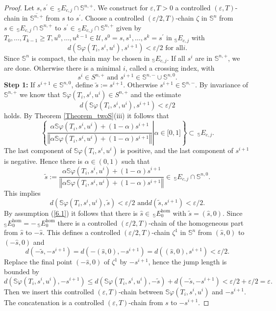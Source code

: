 \documentclass[preprint,12pt]{elsarticle}
\begin{document}
\begin{proof}
Let $s,s^{\prime}\in\,_{\mathbb{S}}E_{c,j}\cap\mathbb{S}^{n,+}$. We construct
for $\varepsilon,T>0$ a controlled $(\varepsilon,T)$-chain in $\overline
{\mathbb{S}^{n,+}}$ from $s$ to $s^{\prime}$. Choose a controlled
$(\varepsilon/2,T)$-chain $\zeta$ in $\mathbb{S}^{n}$ from $s\in
\,_{\mathbb{S}}E_{c,j}\cap\mathbb{S}^{n,+}$ to $s^{\prime}\in\,_{\mathbb{S}%
}E_{c,j}\cap\mathbb{S}^{n,+}$ given by $T_{0},\ldots,T_{k-1}\geq
T,u^{0},\ldots,u^{k-1}\in\mathcal{U},s^{0}=s,s^{1},\ldots,s^{k}=s^{\prime}$ in
$_{\mathbb{S}}E_{c,j}$ with%
\[
d(\mathbb{S}\varphi(T_{i},s^{i},u^{i}),s^{i+1})<\varepsilon/2\text{ for all
}i.
\]
Since $\mathbb{S}^{n}$ is compact, the chain may be chosen in $_{\mathbb{S}%
}E_{c,j}$. If all $s^{i}$ are in $\mathbb{S}^{n,+}$, we are done. Otherwise
there is a minimal $i$, called a crossing index, with%
\begin{equation}
s^{i}\in S^{n,+}\text{ and }s^{i+1}\in\mathbb{S}^{n,-}\cup\mathbb{S}^{n,0}.
\label{crossing}%
\end{equation}
\textbf{Step 1: }If $s^{i+1}\in\mathbb{S}^{n,0}$, define $\widetilde
{s}:=s^{i+1}$. Otherwise $s^{i+1}\in\mathbb{S}^{n,-}$. By invariance of
$\mathbb{S}^{n,+}$ we know that $\mathbb{S}\varphi(T_{i},s^{i},u^{i})\in
S^{n,+}$ and the estimate%
\[
d(\mathbb{S}\varphi(T_{i},s^{i},u^{i}),s^{i+1})<\varepsilon/2
\]
holds. By Theorem \ref{Theorem_twoS}(iii) it follows that%
\[
\left\{  \left.  \frac{\alpha\mathbb{S}\varphi(T_{i},s^{i},u^{i}%
)+(1-\alpha)s^{i+1}}{\left\Vert \alpha\mathbb{S}\varphi(T_{i},s^{i}%
,u^{i})+(1-\alpha)s^{i+1}\right\Vert }\right\vert \alpha\in\lbrack
0,1]\right\}  \subset\,_{\mathbb{S}}E_{c,j}.
\]
The last component of $\mathbb{S}\varphi(T_{i},s^{i},u^{i})$ is positive, and
the last component of $s^{i+1}$ is negative. Hence there is $\alpha\in(0,1)$
such that%
\[
\widetilde{s}:=\frac{\alpha\mathbb{S}\varphi(T_{i},s^{i},u^{i})+(1-\alpha
)s^{i+1}}{\left\Vert \alpha\mathbb{S}\varphi(T_{i},s^{i},u^{i})+(1-\alpha
)s^{i+1}\right\Vert }\in\,_{\mathbb{S}}E_{c,j}\cap\mathbb{S}^{n,0}.
\]
This implies%
\[
d(\mathbb{S}\varphi(T_{i},s^{i},u^{i}),\widetilde{s})<\varepsilon/2\text{ and
}d(\widetilde{s},s^{i+1})<\varepsilon/2.
\]
By assumption (\ref{6.1}) it follows that there is $\widehat{s}\in
\,_{\mathbb{S}}E_{0}^{\hom}$ with $\widetilde{s}=(\widehat{s},0)$. Since
$_{\mathbb{S}}E_{0}^{\hom}=-\,_{\mathbb{S}}E_{0}^{\hom}$ there is a controlled
$(\varepsilon/2,T)$-chain of the homogeneous part from $\widehat{s}$ to
$-\widehat{s}$. This defines a controlled $(\varepsilon/2,T)$-chain $\zeta
^{1}$ in $\mathbb{S}^{n}$ from $(\widehat{s},0)$ to $(-\widehat{s},0)$ and%
\[
d(-\widetilde{s},-s^{i+1})=d(-(\widehat{s},0),-s^{i+1})=d((\widehat
{s},0),s^{i+1})<\varepsilon/2.
\]
Replace the final point $(-\widehat{s},0)$ of $\zeta^{1}$ by $-s^{i+1}$, hence
the jump length is bounded by%
\[
d(\mathbb{S}\varphi(T_{i},s^{i},u^{i}),-s^{i+1})\leq d(\mathbb{S}\varphi
(T_{i},s^{i},u^{i}),-\widetilde{s})+d(-\widetilde{s},-s^{i+1})<\varepsilon
/2+\varepsilon/2=\varepsilon.
\]
Then we insert this controlled $(\varepsilon,T)$-chain between $\mathbb{S}%
\varphi(T_{i},s^{i},u^{i})$ and $-s^{i+1}$. The concatenation is a controlled
$(\varepsilon,T)$-chain from $s$ to $-s^{i+1}$.


\end{proof}
\end{document}

